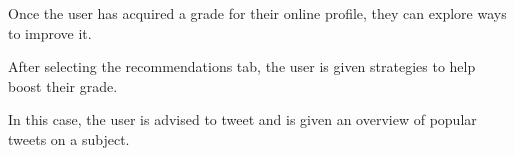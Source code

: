 \begin{minipage}{\textwidth}
  \centering
  \begin{minipage}[t]{4.6cm}
    \vspace{0pt}
    \centering
    \begin{minipage}{4.4cm}
      Once the user has acquired a grade for their online profile, they can explore ways to improve it.
    \end{minipage}
  \end{minipage}
  \begin{minipage}[t]{4.6cm}
    \vspace{0pt}
    \centering
    \begin{minipage}{4.4cm}
      After selecting the recommendations tab, the user is given strategies to help boost their grade.
    \end{minipage}
  \end{minipage}
  \begin{minipage}[t]{4.6cm}
    \vspace{0pt}
    \centering
    \begin{minipage}{4.4cm}
      In this case, the user is advised to tweet and is given an overview of popular tweets on a subject.
    \end{minipage}
  \end{minipage}
\end{minipage}
